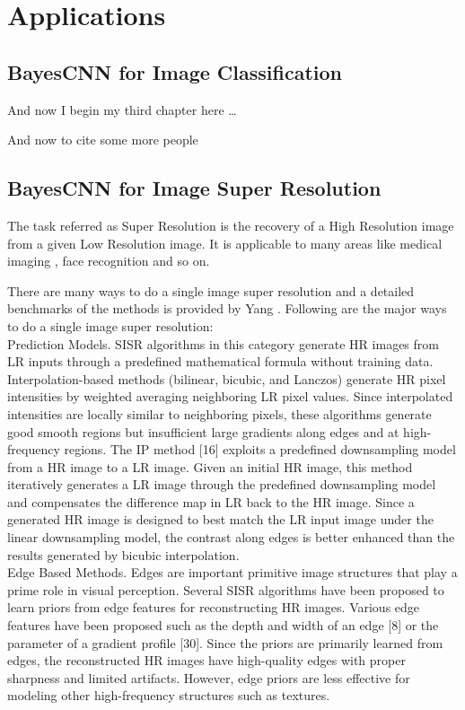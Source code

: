 \chapter{Applications}


\section{BayesCNN for Image Classification}
And now I begin my third chapter here \dots

And now to cite some more people~\citet{Rea85,Ancey1996}

\section{BayesCNN for Image Super Resolution}

The task referred as Super Resolution is the recovery of a High Resolution image from a given Low Resolution image. It is applicable to many areas like medical imaging \citet{10.1007/978-3-642-40760-4_2}, face recognition \citet{1203152} and so on.

There are many ways to do a single image super resolution and a detailed benchmarks of the methods is provided by Yang \citet{Yang2014SingleImageSA}. Following are the major ways to do a single image super resolution:\\
Prediction Models. SISR algorithms in this category generate HR images
from LR inputs through a predefined mathematical formula without training
data. Interpolation-based methods (bilinear, bicubic, and Lanczos) generate HR pixel intensities by weighted averaging neighboring LR pixel values. Since interpolated intensities are locally similar to neighboring pixels, these algorithms generate good smooth regions but insufficient large gradients along edges and at high-frequency regions. The IP method [16] exploits a predefined downsampling model from a HR image to a LR image. Given an initial HR image, this method iteratively generates a LR image through the predefined downsampling model and compensates the difference map in LR back to the HR image. Since a generated HR image is designed to best match the LR input image under the linear downsampling model, the contrast along edges is better enhanced than the results generated by bicubic interpolation.\\

Edge Based Methods. Edges are important primitive image structures that
play a prime role in visual perception. Several SISR algorithms have been proposed to learn priors from edge features for reconstructing HR images. Various edge features have been proposed such as the depth and width of an edge [8] or the parameter of a gradient profile [30]. Since the priors are primarily learned from edges, the reconstructed HR images have high-quality edges with proper sharpness and limited artifacts. However, edge priors are less effective for modeling other high-frequency structures such as textures.\\

